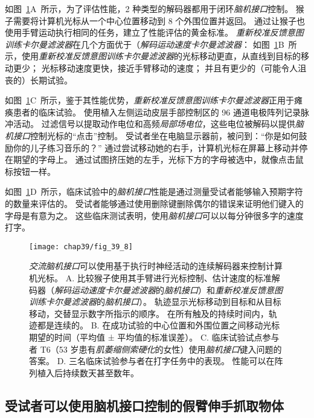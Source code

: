 如图~\ref{fig:39_8}A~所示，为了评估性能，2 种类型的解码器都用于闭环\textit{脑机接口}控制。
猴子需要将计算机光标从一个中心位置移动到 8 个外围位置并返回。
通过让猴子也使用手臂运动执行相同的任务，建立了性能评估的黄金标准。
\textit{重新校准反馈意图训练卡尔曼滤波器}在几个方面优于（\textit{解码运动速度卡尔曼滤波器}：
如图~\ref{fig:39_8}B~所示，使用\textit{重新校准反馈意图训练卡尔曼滤波器}的光标移动更直，从直线到目标的移动更少；
光标移动速度更快，接近手臂移动的速度；
并且有更少的（可能令人沮丧的）长期试验。


如图~\ref{fig:39_8}C~所示，鉴于其性能优势，\textit{重新校准反馈意图训练卡尔曼滤波器}正用于瘫痪患者的临床试验。
使用植入左侧运动皮层手部控制区的 96 通道电极阵列记录脉冲活动。
过滤信号以提取动作电位和高频\textit{局部场电位}，这些电位被解码以提供\textit{脑机接口}控制光标的“点击”控制。
受试者坐在电脑显示器前，被问到：“你是如何鼓励你的儿子练习音乐的？” 
通过尝试移动她的右手，计算机光标在屏幕上移动并停在期望的字母上。
通过试图挤压她的左手，光标下方的字母被选中，就像点击鼠标按钮一样。


如图~\ref{fig:39_8}D~所示，临床试验中的\textit{脑机接口}性能是通过测量受试者能够输入预期字符的数量来评估的。
受试者能够通过使用删除键删除偶尔的错误来证明他们键入的字母是有意为之。
这些临床测试表明，使用\textit{脑机接口}可以以每分钟很多字的速度打字。


\begin{figure}[htbp]
	\centering
	\texttt{[image: chap39/fig\_39\_8]}
	\caption{\textit{交流脑机接口}可以使用基于执行时神经活动的连续解码器来控制计算机光标。
		A. 比较猴子使用其手臂进行光标控制、估计速度的标准解码器（\textit{解码运动速度卡尔曼滤波器}的\textit{脑机接口}）和\textit{重新校准反馈意图训练卡尔曼滤波器}的\textit{脑机接口}）。
		轨迹显示光标移动到目标和从目标移动，交替显示数字所指示的顺序。
		在所有触及的持续时间内，轨迹都是连续的\cite{gilja2012high}。
		B. 在成功试验的中心位置和外围位置之间移动光标期望的时间（平均值 ± 平均值的标准误差）\cite{gilja2012high}。
		C. 临床试验试点参与者 T6（53 岁患有\textit{肌萎缩侧索硬化}的女性）使用\textit{脑机接口}键入问题的答案\cite{pandarinath2017high}。
		D. 三名临床试验参与者在打字任务中的表现。
		性能可以在阵列植入后持续数天甚至数年\cite{pandarinath2017high}。}
	\label{fig:39_8}
\end{figure}



\subsection{受试者可以使用脑机接口控制的假臂伸手抓取物体}

